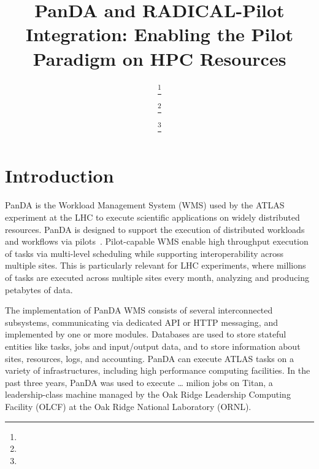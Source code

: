 \documentclass{webofc}
\begin{document}
%
\title{PanDA and RADICAL-Pilot Integration: Enabling the Pilot Paradigm on HPC Resources}
%
%

\author{ \fnsep\thanks{} \and
         \fnsep\thanks{} \and
         \fnsep\thanks{}
}


%
\maketitle
%
\section{Introduction}
\label{intro}
PanDA is the Workload Management System (WMS) used by the ATLAS experiment at the LHC to execute scientific applications on widely distributed resources.  PanDA is designed to support the execution of distributed workloads and workflows via pilots~\cite{turilli2017comprehensive}. Pilot-capable WMS enable high throughput execution of tasks via multi-level scheduling while supporting interoperability across multiple sites. This is particularly relevant for LHC experiments, where millions of tasks are executed across multiple sites every month, analyzing and producing petabytes of data.

The implementation of PanDA WMS consists of several interconnected subsystems, communicating via dedicated API or HTTP messaging, and implemented by one or more modules. Databases are used to store stateful entities like tasks, jobs and input/output data, and to store information about sites, resources, logs, and accounting. PanDA can execute ATLAS tasks on a variety of infrastructures, including high performance computing facilities. In the past three years, PanDA was used to execute … milion jobs on Titan, a leadership-class machine managed by the Oak Ridge Leadership Computing Facility (OLCF) at the Oak Ridge National Laboratory (ORNL). 
\end{document}
